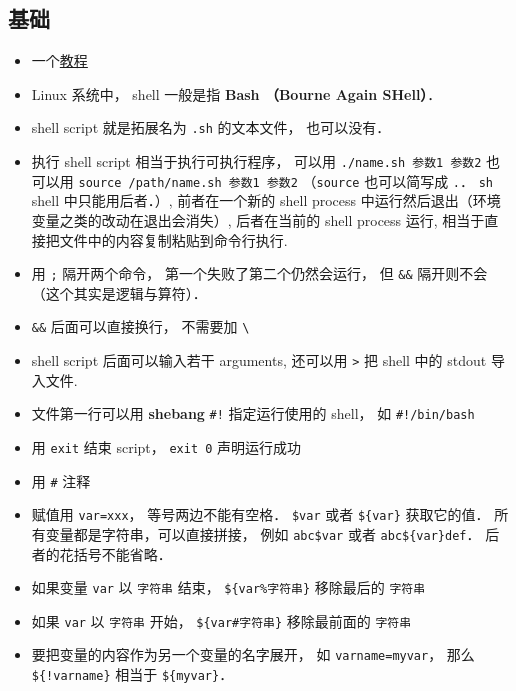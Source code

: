 
\begin{issues}
\issueDraft
\end{issues}


\subsection{基础}
\begin{itemize}
\item 一个\href{https://tldp.org/LDP/abs/html/why-shell.html}{教程}
\item Linux 系统中， shell 一般是指 \textbf{Bash （Bourne Again SHell）}．
\item shell script 就是拓展名为 \verb`.sh` 的文本文件， 也可以没有．
\item 执行 shell script 相当于执行可执行程序， 可以用 \verb`./name.sh 参数1 参数2` 也可以用 \verb`source /path/name.sh 参数1 参数2` （\verb|source| 也可以简写成 \verb|.|． \verb|sh| shell 中只能用后者．）, 前者在一个新的 shell process 中运行然后退出（环境变量之类的改动在退出会消失）, 后者在当前的 shell process 运行, 相当于直接把文件中的内容复制粘贴到命令行执行.
\item 用 \verb|;| 隔开两个命令， 第一个失败了第二个仍然会运行， 但 \verb|&&| 隔开则不会（这个其实是逻辑与算符）．
\item \verb|&&| 后面可以直接换行， 不需要加 \verb|\|
\item shell script 后面可以输入若干 arguments, 还可以用 \verb`>` 把 shell 中的 stdout 导入文件.
\item 文件第一行可以用 \textbf{shebang} \verb`#!` 指定运行使用的 shell， 如 \verb`#!/bin/bash`
\item 用 \verb|exit| 结束 script， \verb`exit 0` 声明运行成功
\item 用 \verb`#` 注释
\item 赋值用 \verb`var=xxx`， 等号两边不能有空格． \verb|$var| 或者 \verb|${var}| 获取它的值． 所有变量都是字符串，可以直接拼接， 例如 \verb|abc$var| 或者 \verb|abc${var}def|． 后者的花括号不能省略．
\item 如果变量 \verb|var| 以 \verb|字符串| 结束， \verb|${var%字符串}| 移除最后的 \verb|字符串|
\item 如果 \verb|var| 以 \verb|字符串| 开始， \verb|${var#字符串}| 移除最前面的 \verb|字符串|
\item 要把变量的内容作为另一个变量的名字展开， 如 \verb|varname=myvar|， 那么 \verb|${!varname}| 相当于 \verb|${myvar}|．

\end{itemize}
